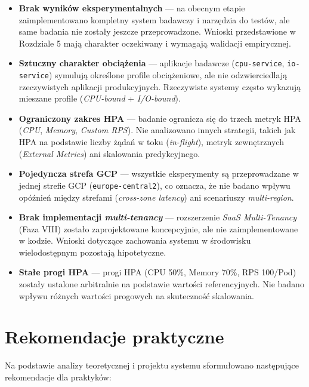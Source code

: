 \begin{itemize}
  \item \textbf{Brak wyników eksperymentalnych} — na obecnym etapie zaimplementowano kompletny system badawczy i narzędzia do testów, ale same badania nie zostały jeszcze przeprowadzone. Wnioski przedstawione w Rozdziale 5 mają charakter oczekiwany i wymagają walidacji empirycznej.

  \item \textbf{Sztuczny charakter obciążenia} — aplikacje badawcze (\texttt{cpu-service}, \texttt{io-service}) symulują określone profile obciążeniowe, ale nie odzwierciedlają rzeczywistych aplikacji produkcyjnych. Rzeczywiste systemy często wykazują mieszane profile (\textit{CPU-bound} + \textit{I/O-bound}).

  \item \textbf{Ograniczony zakres HPA} — badanie ogranicza się do trzech metryk HPA (\textit{CPU}, \textit{Memory}, \textit{Custom RPS}). Nie analizowano innych strategii, takich jak HPA na podstawie liczby żądań w toku (\textit{in-flight}), metryk zewnętrznych (\textit{External Metrics}) ani skalowania predykcyjnego.

  \item \textbf{Pojedyncza strefa GCP} — wszystkie eksperymenty są przeprowadzane w jednej strefie GCP (\texttt{europe-central2}), co oznacza, że nie badano wpływu opóźnień między strefami (\textit{cross-zone latency}) ani scenariuszy \textit{multi-region}.

  \item \textbf{Brak implementacji \textit{multi-tenancy}} — rozszerzenie \textit{SaaS Multi-Tenancy} (Faza VIII) zostało zaprojektowane koncepcyjnie, ale nie zaimplementowane w kodzie. Wnioski dotyczące zachowania systemu w środowisku wielodostępnym pozostają hipotetyczne.

  \item \textbf{Stałe progi HPA} — progi HPA (CPU 50\%, Memory 70\%, RPS 100/Pod) zostały ustalone arbitralnie na podstawie wartości referencyjnych. Nie badano wpływu różnych wartości progowych na skuteczność skalowania.
\end{itemize}

\section{Rekomendacje praktyczne}

Na podstawie analizy teoretycznej i projektu systemu sformułowano następujące rekomendacje dla praktyków:

